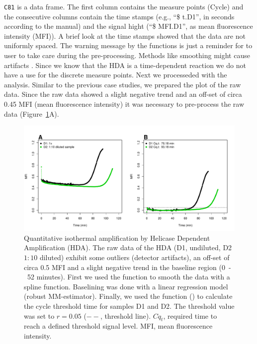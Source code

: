 
\texttt{C81} is a data frame. The first column contains the measure points 
(Cycle) and the consecutive columns contain the time stamps (e.g., ``\$ t.D1'', 
in seconds according to the  manual) and the signal hight (``\$ 
MFI.D1'', as mean fluorescence intensity (MFI)). A brief look at the time stamps 
showed that the data are not uniformly spaced. The warning message by the 
 functions is just a reminder for to user to take care during the 
pre-processing. Methods like smoothing might cause artifacts 
\citep{Spiess_2014}. Since we know that the HDA is a time-dependent reaction we 
do not have a use for the discrete measure points. Next we processeded with the 
analysis. Similar to the previous case studies, we prepared the plot of the raw 
data. Since the raw data showed a slight negative trend and an off-set of circa 
0.45 MFI (mean fluorescence intensity) it was necessary to pre-process the raw 
data (Figure~\ref{figure:qIA}A).

\begin{figure}[htbp]
  \centering
  \includegraphics[clip=true, trim=0.15cm 0.55cm 1cm 1.3cm, width=12cm]{figures/qIA.pdf}
  \caption{Quantitative isothermal amplification by Helicase Dependent 
Amplification (HDA).  The raw data of the HDA (D1, undiluted, D2 
$1:10$ diluted) exhibit some outliers (detector artifacts), an off-set of circa 
0.5 MFI and a slight negative trend in the 
baseline region (0~-~52 minutes).  First we used the  
function to smooth the data with a spline function. Baselining was done with a 
linear regression model (robust MM-estimator). Finally, we used the 
 function () to calculate the cycle threshold time 
for samples D1 and D2. The threshold value was set to $r = 0.05$ ($--$, 
threshold line). $Cq_{t}$, required time to reach a defined threshold signal 
level. MFI, mean fluorescence intensity.}
  \label{figure:qIA}
\end{figure}

